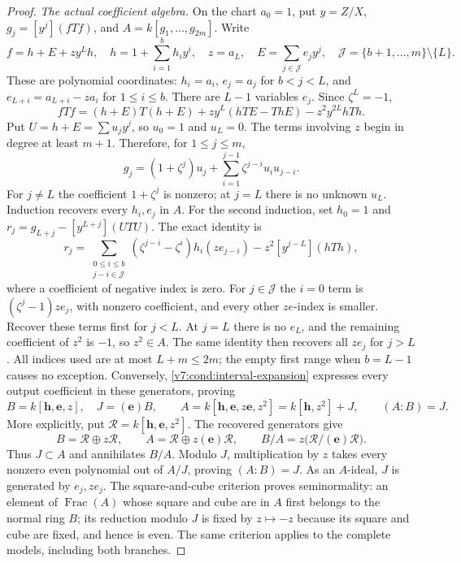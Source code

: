 \documentclass[10pt,fleqn]{article}
\numberwithin{equation}{section}
\begin{document}
\begin{proof}
\emph{The actual coefficient algebra.}
On the chart $a_0=1$, put $y=Z/X$, $g_j=[y^j](fTf)$, and
$A=k[g_1,\ldots,g_{2m}]$.  Write
\[
 f=h+E+zy^Lh,\quad h=1+\sum_{i=1}^b h_i y^i,\quad z=a_L,
 \quad E=\sum_{j\in\mathcal J}e_jy^j,
 \quad\mathcal J=\{b+1,\ldots,m\}\setminus\{L\}.
\]
These are polynomial coordinates: $h_i=a_i$, $e_j=a_j$ for $b<j<L$,
and $e_{L+i}=a_{L+i}-za_i$ for $1\le i\le b$.
There are $L-1$ variables $e_j$.  Since $\zeta^L=-1$,
\begin{equation}\label{v7:cond:interval-expansion}
 fTf=(h+E)T(h+E)+zy^L(hTE-ThE)-z^2y^{2L}hTh.
\end{equation}
Put $U=h+E=\sum u_jy^j$, so $u_0=1$ and $u_L=0$.
The terms involving $z$ begin in degree at least $m+1$.  Therefore,
for $1\le j\le m$,
\[
 g_j=(1+\zeta^j)u_j+
       \sum_{i=1}^{j-1}\zeta^{j-i}u_i u_{j-i}.
\]
For $j\ne L$ the coefficient $1+\zeta^j$ is nonzero; at $j=L$
there is no unknown $u_L$.  Induction recovers every $h_i,e_j$ in $A$.
For the second induction, set $h_0=1$ and
$r_j=g_{L+j}-[y^{L+j}](UTU)$.  The exact identity is
\[
 r_j=\sum_{\substack{0\le i\le b\\j-i\in\mathcal J}}
       (\zeta^{j-i}-\zeta^i)h_i(ze_{j-i})
       -z^2[y^{j-L}](hTh),
\]
where a coefficient of negative index is zero.  For $j\in\mathcal J$
the $i=0$ term is $(\zeta^j-1)ze_j$, with nonzero coefficient,
and every other $ze$-index is smaller.  Recover these terms first for
$j<L$.  At $j=L$ there is no $e_L$, and the remaining coefficient
of $z^2$ is $-1$, so $z^2\in A$.  The same identity then recovers
all $ze_j$ for $j>L$.  All indices used are at most $L+m\le2m$;
the empty first range when $b=L-1$ causes no exception.
Conversely, \eqref{v7:cond:interval-expansion} expresses every output
coefficient in these generators, proving
\begin{equation}\label{v6:cond:high-ring}
 B=k[\mathbf h,\mathbf e,z],\quad J=(\mathbf e)B,\qquad
 A=k[\mathbf h,\mathbf e,z\mathbf e,z^2]=k[\mathbf h,z^2]+J,
 \qquad(A:B)=J.
\end{equation}
More explicitly, put $\mathcal R=k[\mathbf h,\mathbf e,z^2]$.
The recovered generators give
\[
 B=\mathcal R\oplus z\mathcal R,\qquad
 A=\mathcal R\oplus z(\mathbf e)\mathcal R,\qquad
 B/A=z\bigl(\mathcal R/(\mathbf e)\mathcal R\bigr).
\]
Thus $J\subset A$ and annihilates $B/A$.  Modulo $J$, multiplication by
$z$ takes every nonzero even polynomial out of $A/J$, proving
$(A:B)=J$.  As an $A$-ideal, $J$ is generated by $e_j,ze_j$.
The square-and-cube criterion proves seminormality: an element of
$\operatorname{Frac}(A)$ whose square and cube are in $A$ first belongs
to the normal ring $B$; its reduction modulo $J$ is fixed by $z\mapsto-z$
because its square and cube are fixed, and hence is even.  The same
criterion applies to the complete models, including both branches.


\end{proof}
\end{document}
